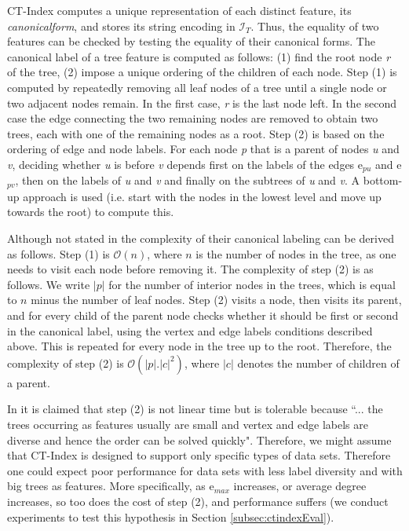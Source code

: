 \documentclass{l4proj}
\newcommand{\fancyI}{\mathcal{I}}
\begin{document}
CT-Index computes a unique representation of each distinct feature, its \emph{\gls{canonicalform}}, and stores its string encoding in $\fancyI_{T}$. Thus, the equality of two features can be checked by testing the equality of their canonical forms. The canonical label of a tree feature is computed as follows: (1) find the root node \emph{r} of the tree, (2) impose a unique ordering of the children of each node. Step (1) is computed by repeatedly removing all leaf nodes of a tree until a single node or two adjacent nodes remain. In the first case, \emph{r} is the last node left. In the second case the edge connecting the two remaining nodes are removed to obtain two trees, each with one of the remaining nodes as a root.
Step (2) is based on the ordering of edge and node labels. For each node \textit{p} that is a parent of nodes \textit{u} and \textit{v}, deciding whether \textit{u} is before \textit{v} depends first on the labels of the edges e$_{pu}$ and e$_{pv}$, then on the labels of \textit{u} and \textit{v} and finally on the subtrees of \textit{u} and \textit{v}. A bottom-up approach is used (i.e. start with the nodes in the lowest level and move up towards the root) to compute this.

Although not stated in \cite{ctindex} the complexity of their canonical labeling can be derived as follows. Step (1) is $\mathcal{O}(n)$, where $n$ is the number of nodes in the tree, as one needs to visit each node before removing it. The complexity of step (2) is as follows. We write $|p|$ for the number of interior nodes in the trees, which is equal to $n$ minus the number of leaf nodes. Step (2) visits a node, then visits its parent, and for every child of the parent node checks whether it should be first or second in the canonical label, using the vertex and edge labels conditions described above. This is repeated for every node in the tree up to the root. Therefore, the complexity of step (2) is $\mathcal{O}(|p|.|c|^{2})$, where $|c|$ denotes the number of children of a parent.

In \cite{ctindex} it is claimed that step (2) is not linear time but is tolerable because ``... the trees occurring as features usually are small and vertex and edge labels are diverse and hence the order can be solved quickly". Therefore, we might assume that CT-Index is designed to support only specific types of data sets. Therefore one could expect poor performance for data sets with less label diversity and with big trees as features. More specifically, as e$_{max}$ increases, or average degree increases, so too does the cost of step (2), and performance suffers (we conduct experiments to test this hypothesis in Section \ref{subsec:ctindexEval}).
\end{document}
